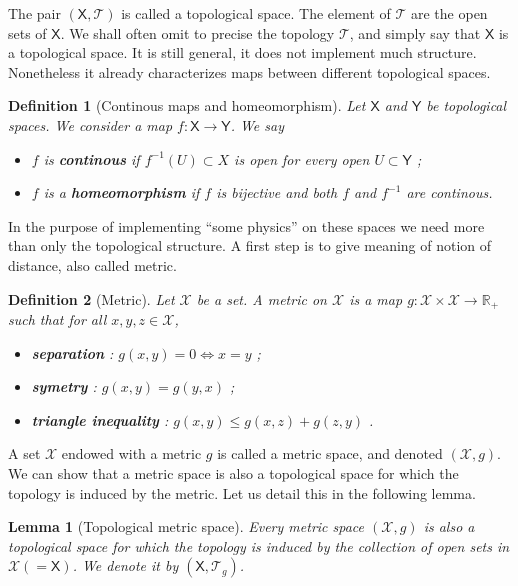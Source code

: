 \documentclass[11pt]{book}
\newcommand{\Tcal}{\mathcal{T}}
\newcommand{\Xcal}{\mathcal{X}}
\newcommand{\Rbb}{\mathbb{R}}
\newcommand{\Xsf}{\mathsf{X}}
\newcommand{\Ysf}{\mathsf{Y}}
\theoremstyle{break}
\newtheorem{lemma}{Lemma}
\newtheorem{definition}{Definition}
\begin{document}
The pair $(\Xsf,\Tcal)$ is called a topological space. The element of $\Tcal$ are the open sets of $\Xsf$. We shall often omit to precise the topology $\Tcal$, and simply say that $\Xsf$ is a topological space. It is still general, it does not implement much structure. Nonetheless it already characterizes maps between different topological spaces.\par%


\begin{definition}[Continous maps and homeomorphism]
Let $\Xsf$ and $\Ysf$ be topological spaces. We consider a map $f : \Xsf \to \Ysf$. We say
%
\begin{itemize}
\vspace*{-4pt}
\setlength{\itemsep}{-1pt}
\item $f$ is \textbf{continous} if $f^{-1}(U) \subset X$ is open for every open $U \subset\Ysf$ ;
\item $f$ is a \textbf{homeomorphism} if $f$ is bijective and both $f$ and $f^{-1}$ are continous.
\end{itemize}
%
\end{definition}


In the purpose of implementing ``some physics'' on these spaces we need more than only the topological structure. A first step is to give meaning of notion of distance, also called metric.


\begin{definition}[Metric]
Let $\Xcal$ be a set. A metric on $\Xcal$ is a map $g : \Xcal \times \Xcal \to \Rbb_+$ such that for all $x, y, z \in \Xcal$,%
%
\begin{itemize}
\vspace*{-4pt}
\setlength{\itemsep}{-1pt}
\item \textbf{separation} : $g(x,y) = 0 \Leftrightarrow x=y$ ; 
\item \textbf{symetry} : $g(x,y) = g(y,x)$ ;
\item \textbf{triangle inequality} : $g(x,y) \leq g(x,z) + g(z,y)$ .
\end{itemize}
%
\end{definition}


A set $\Xcal$ endowed with a metric $g$ is called a metric space, and denoted $(\Xcal,g)$. We can show that a metric space is also a topological space for which the topology is induced by the metric. Let us detail this in the following lemma.


\begin{lemma}[Topological metric space]
Every metric space $(\Xcal,g)$ is also a topological space for which the topology is induced by the collection of open sets in $\Xcal(=\Xsf)$. We denote it by $(\Xsf,\Tcal_g)$.
\end{lemma}
\end{document}
